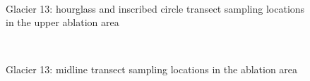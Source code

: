 \documentclass{sfuthesis}
\begin{document}
\begin{appendices}
\begin{figure}[H]
	\\
\caption[]{Glacier 13: hourglass and inscribed circle transect sampling locations in the upper ablation area}
\end{figure}
	\begin{figure}[H]
	\centering
	\\
\caption[]{Glacier 13: midline transect sampling locations in the ablation area}
\end{figure}
	\begin{figure}[H]
	\centering

\end{figure}
\end{appendices}
\end{document}

